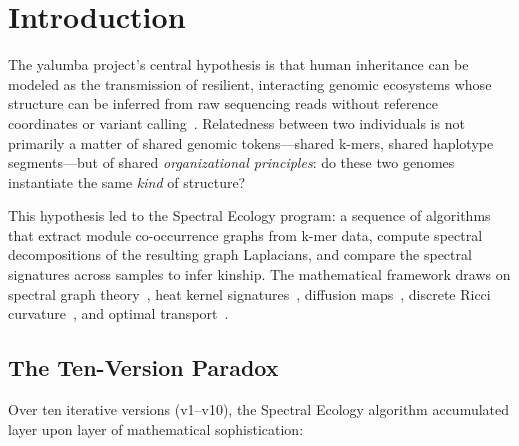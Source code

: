 \documentclass{../yalumba}
\begin{document}
\begin{abstract}
The result is a cautionary tale for computational biology: sophisticated
downstream analysis cannot rescue a non-deterministic upstream representation.
No amount of spectral geometry, optimal transport, or topological persistence
can extract signal from a feature space dominated by hash table insertion
artifacts. The path forward requires measurement science discipline---acceptance
gates on representation stability before any kinship model is attempted.
\end{abstract}

\newpage
\tableofcontents
\newpage

\section{Introduction}
\label{sec:introduction}

The yalumba project's central hypothesis is that human inheritance can be modeled
as the transmission of resilient, interacting genomic ecosystems whose structure
can be inferred from raw sequencing reads without reference coordinates or variant
calling~\cite{thompson2013identity}. Relatedness between two individuals is not
primarily a matter of shared genomic tokens---shared k-mers, shared haplotype
segments---but of shared \textit{organizational principles}: do these two genomes
instantiate the same \textit{kind} of structure?

This hypothesis led to the Spectral Ecology program: a sequence of algorithms
that extract module co-occurrence graphs from k-mer data, compute spectral
decompositions of the resulting graph Laplacians, and compare the spectral
signatures across samples to infer kinship. The mathematical framework draws on
spectral graph theory~\cite{chung1997spectral}, heat kernel
signatures~\cite{sun2009concise}, diffusion maps~\cite{coifman2006diffusion},
discrete Ricci curvature~\cite{jost2011riemannian}, and optimal
transport~\cite{villani2009optimal}.

\subsection{The Ten-Version Paradox}

Over ten iterative versions (v1--v10), the Spectral Ecology algorithm accumulated
layer upon layer of mathematical sophistication:
\end{document}
